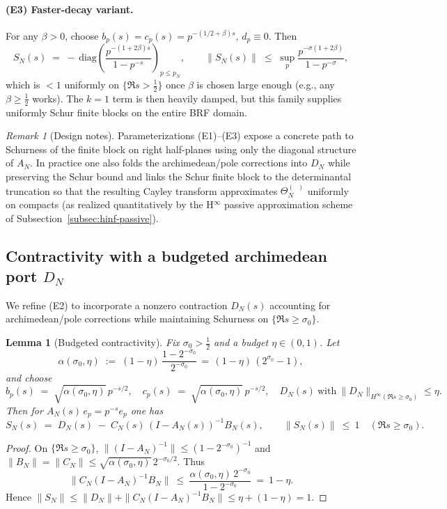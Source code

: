 \documentclass[11pt]{article}
\newtheorem{lemma}[theorem]{Lemma}
\theoremstyle{remark}
\newtheorem{remark}[theorem]{Remark}
\DeclareMathOperator{\dettwo}{det_2}
\begin{document}
\paragraph{(E3) Faster-decay variant.}
For any $\beta>0$, choose $b_p(s)=c_p(s)=p^{-(1/2+\beta)s}$, $d_p\equiv 0$. Then
\[
 S_N(s)\;=\;-\,\mathrm{diag}\!\left(\frac{p^{-(1+2\beta)s}}{1-p^{-s}}\right)_{p\le p_N},\qquad \|S_N(s)\|\;\le\;\sup_p\frac{p^{-\sigma(1+2\beta)}}{1-p^{-\sigma}},
\]
which is $<1$ uniformly on $\{\Re s>\tfrac12\}$ once $\beta$ is chosen large enough (e.g., any $\beta\ge \tfrac12$ works). The $k=1$ term is then heavily damped, but this family supplies uniformly Schur finite blocks on the entire BRF domain.

\begin{remark}[Design notes]
Parameterizations (E1)–(E3) expose a concrete path to Schurness of the finite block on right half-planes using only the diagonal structure of $A_N$. In practice one also folds the archimedean/pole corrections into $D_N$ while preserving the Schur bound and links the Schur finite block to the determinantal truncation so that the resulting Cayley transform approximates $\Theta_N^{(\dettwo)}$ uniformly on compacts (as realized quantitatively by the H$^\infty$ passive approximation scheme of Subsection~\ref{subsec:hinf-passive}).
\end{remark}

\subsection{Contractivity with a budgeted archimedean port $D_N$}\label{subsec:DN-budget}
We refine (E2) to incorporate a nonzero contraction $D_N(s)$ accounting for archimedean/pole corrections while maintaining Schurness on $\{\Re s\ge \sigma_0\}$.

\begin{lemma}[Budgeted contractivity]\label{lem:budget}
Fix $\sigma_0>\tfrac12$ and a budget $\eta\in(0,1)$. Let
\[
 \alpha(\sigma_0,\eta)\;:=\;(1-\eta)\,\frac{1-2^{-\sigma_0}}{2^{-\sigma_0}}\,=\,(1-\eta)\,(2^{\sigma_0}-1),
\]
and choose
\[
 b_p(s)\;=\;\sqrt{\alpha(\sigma_0,\eta)}\,p^{-s/2},\quad c_p(s)\;=\;\sqrt{\alpha(\sigma_0,\eta)}\,p^{-s/2},\quad D_N(s)\ \text{with}\ \|D_N\|_{H^\infty(\Re s\ge \sigma_0)}\le \eta.
\]
Then for $A_N(s)\,e_p=p^{-s}e_p$ one has
\[
 S_N(s)\;=\;D_N(s)\; -\; C_N(s)\,(I-A_N(s))^{-1}B_N(s),\qquad \|S_N(s)\|\ \le\ 1\quad (\Re s\ge \sigma_0).
\]
\end{lemma}
\begin{proof}
On $\{\Re s\ge \sigma_0\}$, $\|(I-A_N)^{-1}\|\le (1-2^{-\sigma_0})^{-1}$ and $\|B_N\|=\|C_N\|\le \sqrt{\alpha(\sigma_0,\eta)}\,2^{-\sigma_0/2}$. Thus
\[
 \|C_N(I-A_N)^{-1}B_N\|\ \le\ \frac{\alpha(\sigma_0,\eta)\,2^{-\sigma_0}}{1-2^{-\sigma_0}}\ =\ 1-\eta.
\]
Hence $\|S_N\|\le \|D_N\|+\|C_N(I-A_N)^{-1}B_N\|\le \eta+(1-\eta)=1$.
\end{proof}
\end{document}
